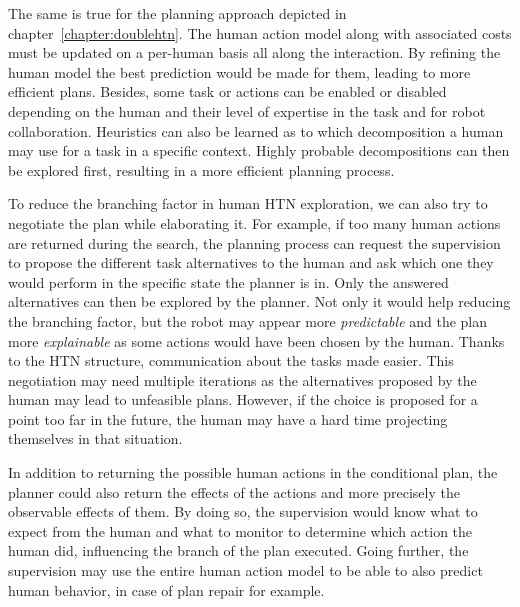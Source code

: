 \documentclass[a4paper,11pt,twoside]{StyleThese}
\begin{document}
The same is true for the planning approach depicted in chapter~\ref{chapter:doublehtn}. The human action model along with associated costs must be updated on a per-human basis all along the interaction. By refining the human model the best prediction would be made for them, leading to more efficient plans. Besides, some task or actions can be enabled or disabled depending on the human and their level of expertise in the task and for robot collaboration. Heuristics can also be learned as to which decomposition a human may use for a task in a specific context. Highly probable decompositions can then be explored first, resulting in a more efficient planning process.

To reduce the branching factor in human HTN exploration, we can also try to negotiate the plan while elaborating it. For example, if too many human actions are returned during the search, the planning process can request the supervision to propose the different task alternatives to the human and ask which one they would perform in the specific state the planner is in. Only the answered alternatives can then be explored by the planner. Not only it would help reducing the branching factor, but the robot may appear more \textit{predictable} and the plan more \textit{explainable} as some actions would have been chosen by the human. Thanks to the HTN structure, communication about the tasks made easier. This negotiation may need multiple iterations as the alternatives proposed by the human may lead to unfeasible plans. However, if the choice is proposed for a point too far in the future, the human may have a hard time projecting themselves in that situation.

In addition to returning the possible human actions in the conditional plan, the planner could also return the effects of the actions and more precisely the observable effects of them. By doing so, the supervision would know what to expect from the human and what to monitor to determine which action the human did, influencing the branch of the plan executed. Going further, the supervision may use the entire human action model to be able to also predict human behavior, in case of plan repair for example.
\end{document}

